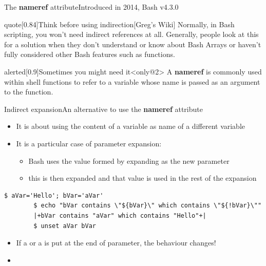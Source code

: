 \begin{frame}[fragile]{The \textbf{nameref} attribute}{Introduced in 2014, Bash v4.3.0}
\begin{varblock}{quote}[0.84\textwidth]{Think before using indirection}[Greg's Wiki]
        \smallskip
        Normally, in Bash scripting, you won't need indirect references at all.
        Generally, people look at this for a solution when they don't understand or know about Bash Arrays or haven't fully considered other Bash features such as functions.
        \smallskip
    \end{varblock}
    \begin{varblock}{alerted}[0.9\textwidth]{Sometimes you might need it}<only@2>
        A \textbf{nameref} is commonly used within shell functions to refer to a variable whose name is passed as an argument to the function.
    \end{varblock}
\end{frame}
\begin{frame}[fragile]{Indirect expansion}{An alternative to use the \textbf{nameref} attribute}
    \vspace{-1mm}
    \begin{itemize}
        \item It is about using the content of a variable as name of a different variable\\[1.5mm]
        \item It is a particular case of parameter expansion: 
              \begin{itemize}
                  \item Bash uses the value formed by expanding  as the new parameter
                  \item this is then expanded and that value is used in the rest of the expansion
              \end{itemize}
    \end{itemize}
    \begin{lstlisting}[style=MyBash, xrightmargin=1mm, aboveskip=2.5mm, belowskip=-4mm]
        $ aVar='Hello'; bVar='aVar'
        $ echo "bVar contains \"${bVar}\" which contains \"${!bVar}\""
        |+bVar contains "aVar" which contains "Hello"+|
        $ unset aVar bVar
    \end{lstlisting}
    \vspace{2mm}
    \begin{itemize}[<2->]
        \item If a \PB{\texttt{*}} or a  is put at the end of parameter, the behaviour changes!\\[0.3em]
        \small\setlength{\itemsep}{0mm}
        \item[] 

\end{itemize}
\end{frame}
